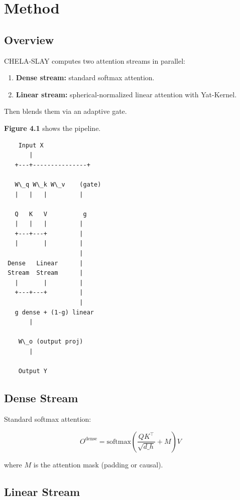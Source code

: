 \section{Method}

\subsection{Overview}

CHELA-SLAY computes two attention streams in parallel:

\begin{enumerate}
\item \textbf{Dense stream:} standard softmax attention.
\item \textbf{Linear stream:} spherical-normalized linear attention with Yat-Kernel.

\end{enumerate}
Then blends them via an adaptive gate.

\textbf{Figure 4.1} shows the pipeline.

\begin{lstlisting}
    Input X
       |
   +---+---------------+
                        
   W\_q W\_k W\_v    (gate)
   |   |   |         |
                      
   Q   K   V          g
   |   |   |         |
   +---+---+         |
   |       |         |
                     |
 Dense   Linear      |
 Stream  Stream      |
   |       |         |
   +---+---+         |
                     |
   g dense + (1-g) linear
       |
        
    W\_o (output proj)
       |
        
    Output Y
\end{lstlisting}

\subsection{Dense Stream}

Standard softmax attention:

\[
O^\text{dense} = \text{softmax}\!\left(\frac{Q K^\top}{\sqrt{d\_h}} + M\right) V
\]

where $M$ is the attention mask (padding or causal).

\subsection{Linear Stream}


